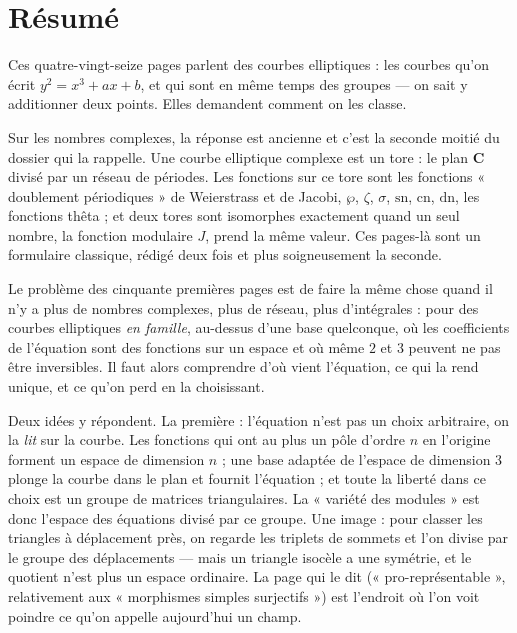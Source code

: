 \documentclass[11pt,a4paper]{article}
\begin{document}
\section*{Résumé}

\begin{resume}
Ces quatre-vingt-seize pages parlent des courbes elliptiques : les courbes
qu'on écrit $y^2 = x^3 + ax + b$, et qui sont en même temps des groupes --- on
sait y additionner deux points. Elles demandent comment on les classe.

Sur les nombres complexes, la réponse est ancienne et c'est la seconde moitié
du dossier qui la rappelle. Une courbe elliptique complexe est un tore : le plan
$\mathbf{C}$ divisé par un réseau de périodes. Les fonctions sur ce tore sont
les fonctions « doublement périodiques » de Weierstrass et de Jacobi, $\wp$,
$\zeta$, $\sigma$, $\mathrm{sn}$, $\mathrm{cn}$, $\mathrm{dn}$, les fonctions
thêta ; et deux tores sont isomorphes exactement quand un seul nombre, la
fonction modulaire $J$, prend la même valeur. Ces pages-là sont un formulaire
classique, rédigé deux fois et plus soigneusement la seconde.

Le problème des cinquante premières pages est de faire la même chose quand il
n'y a plus de nombres complexes, plus de réseau, plus d'intégrales : pour des
courbes elliptiques \emph{en famille}, au-dessus d'une base quelconque, où les
coefficients de l'équation sont des fonctions sur un espace et où même $2$ et
$3$ peuvent ne pas être inversibles. Il faut alors comprendre d'où vient
l'équation, ce qui la rend unique, et ce qu'on perd en la choisissant.

Deux idées y répondent. La première : l'équation n'est pas un choix arbitraire,
on la \emph{lit} sur la courbe. Les fonctions qui ont au plus un pôle d'ordre
$n$ en l'origine forment un espace de dimension $n$ ; une base adaptée de
l'espace de dimension $3$ plonge la courbe dans le plan et fournit l'équation ;
et toute la liberté dans ce choix est un groupe de matrices triangulaires. La
« variété des modules » est donc l'espace des équations divisé par ce groupe.
Une image : pour classer les triangles à déplacement près, on regarde les
triplets de sommets et l'on divise par le groupe des déplacements --- mais un
triangle isocèle a une symétrie, et le quotient n'est plus un espace ordinaire.
La page qui le dit (« pro-représentable », relativement aux « morphismes simples
surjectifs ») est l'endroit où l'on voit poindre ce qu'on appelle aujourd'hui
un champ.


\end{resume}
\end{document}
